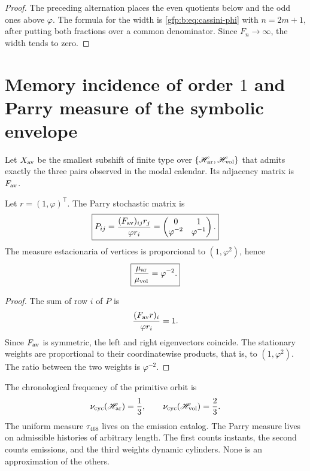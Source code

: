 \begin{proof}
The preceding alternation places the even quotients below and the odd ones
above \(\varphi\). The formula for the width is
\eqref{gfp:b:eq:cassini-phi} with \(n=2m+1\), after putting both fractions over a
common denominator. Since \(F_n\to\infty\), the width tends to zero.
\end{proof}

\section{Memory incidence of order \(1\) and Parry measure of the symbolic envelope}

Let \(X_{\rm av}\) be the smallest subshift of finite type over
\(\{\mathscr H_{\rm ar},\mathscr H_{\rm vol}\}\) that admits exactly
the three pairs observed in the modal calendar. Its adjacency matrix is
\(F_{\rm av}\).

\begin{theorem}
\label{gfp:b:thm:parry-phi}
Let \(r=(1,\varphi)^{\mathsf T}\). The Parry stochastic matrix is
\begin{equation}
 \boxed{
 P_{ij}=
 \frac{(F_{\rm av})_{ij}r_j}{\varphi r_i}
 =
 \begin{pmatrix}
 0&1\\
 \varphi^{-2}&\varphi^{-1}
 \end{pmatrix}.}
 \label{gfp:b:eq:parry-matriz-phi}
\end{equation}
The measure estacionaria of vertices is proporcional to
\((1,\varphi^2)\), hence
\begin{equation}
 \boxed{
 \frac{\mu_{\rm ar}}{\mu_{\rm vol}}=\varphi^{-2}.}
 \label{gfp:b:eq:parry-razon-phi}
\end{equation}
\end{theorem}

\begin{proof}
The sum of row \(i\) of \(P\) is
\[
 \frac{(F_{\rm av}r)_i}{\varphi r_i}=1.
\]
Since \(F_{\rm av}\) is symmetric, the left and right eigenvectors
coincide. The stationary weights are proportional to their coordinatewise
products, that is, to \((1,\varphi^2)\). The ratio between the
two weights is \(\varphi^{-2}\).
\end{proof}

\begin{remark}
The chronological frequency of the primitive orbit is
\[
 \nu_{\rm cyc}(\mathscr H_{\rm ar})=\frac13,
 \qquad
 \nu_{\rm cyc}(\mathscr H_{\rm vol})=\frac23.
\]
The uniform measure \(\tau_{468}\) lives on the emission catalog. The
Parry measure lives on admissible histories of arbitrary length. The
first counts instants, the second counts emissions, and the third weights
dynamic cylinders. None is an approximation of the others.
\end{remark}

